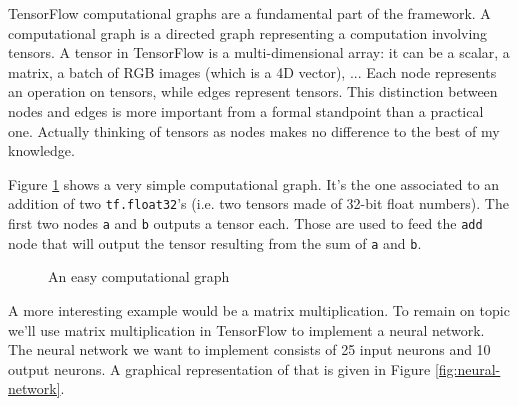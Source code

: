TensorFlow computational graphs are a fundamental part of the
framework. A computational graph is a directed graph representing a
computation involving tensors. A tensor in TensorFlow is a
multi-dimensional array: it can be a scalar, a matrix, a batch of RGB
images (which is a 4D vector), ... Each node represents an operation on
tensors, while edges represent tensors. This distinction between nodes
and edges is more important from a formal standpoint than a practical
one. Actually thinking of tensors as nodes makes no difference to the
best of my knowledge.

Figure \ref{fig:easy-graph} shows a very simple computational graph.
It's the one associated to an addition of two \texttt{tf.float32}'s
(i.e. two tensors made of 32-bit float numbers). The first two nodes
\texttt{a} and \texttt{b} outputs a tensor each. Those are used to feed
the \texttt{add} node that will output the tensor resulting from the
sum of \texttt{a} and \texttt{b}.

\begin{figure}[H]
  \centering
  \caption[easy-graph]{An easy computational graph}
  \label{fig:easy-graph}
\end{figure}

A more interesting example would be a matrix multiplication. To remain
on topic we'll use matrix multiplication in TensorFlow to implement a
neural network. The neural network we want to implement consists of 25
input neurons and 10 output neurons. A graphical representation of that
is given in Figure \ref{fig:neural-network}.

